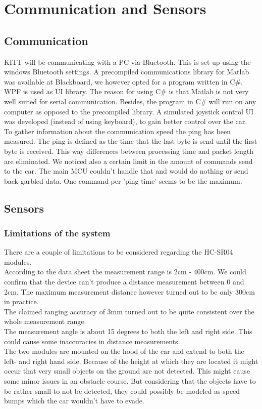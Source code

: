 \documentclass[final]{scrreprt} %
\begin{document}
\chapter{Communication and Sensors}
\section{Communication}
KITT will be communicating with a PC via Bluetooth. 
This is set up using the windows Bluetooth settings.
A precompiled communications library for Matlab was available at Blackboard, we however opted for a program written in C\#.
WPF is used as UI library.
The reason for using C\# is that Matlab is not very well suited for serial communication.
Besides, the program in C\# will run on any computer as opposed to the precompiled library. 
A simulated joystick control UI was developed (instead of using keyboard), to gain better control over the car.
\\
To gather information about the communication speed the ping has been measured. 
The ping is defined as the time that the last byte is send until the first byte is received.
This way differences between processing time and packet length are eliminated.
We noticed also a certain limit in the amount of commands send to the car.
The main MCU couldn't handle that and would do nothing or send back garbled data.
One command per 'ping time' seems to be the maximum.

\section{Sensors}
\subsection{Limitations of the system}

There are a couple of limitations to be considered regarding the HC-SR04 modules.\\
According to the data sheet the measurement range is 2cm - 400cm. 
We could confirm that the device can't produce a distance measurement between 0 and 2cm. 
The maximum measurement distance however turned out to be only 300cm in practice.\\ 
The claimed ranging accuracy of 3mm turned out to be quite consistent over the whole measurement range.\\
The measurement angle is about 15 degrees to both the left and right side. 
This could cause some inaccuracies in distance measurements.\\
The two modules are mounted on the hood of the car and extend to both the left- and right hand side. 
Because of the height at which they are located it might occur that very small objects on the ground are not detected. 
This might cause some minor issues in an obstacle course. 
But considering that the objects have to be rather small to not be detected, they could possibly be modeled as speed bumps which the car wouldn't have to evade.
\end{document}
